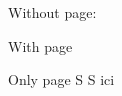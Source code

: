 \documentclass[a5paper]{article}
\begin{document}
Without page: 

With page 

Only page  
\beginnumbering
\pstart
S
\pend
\pstart[\newpage]
S
\pend
\endnumbering
ici
\end{document}
